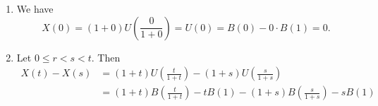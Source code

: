 \documentclass{homework}
\begin{document}
	\question 
	\begin{enumerate}
		\item We have 
		\begin{equation*}
			X(0) = (1+ 0)U\left(\frac{0}{1+0}\right) = U(0) =B(0) - 0\cdot B(1) =0.
		\end{equation*}	
		
		\item Let $0 \le r < s < t$. Then
		\begin{align*}
			X(t) - X(s) &= (1+t)U\left(\frac{t}{1+t}\right) - (1+s)U\left(\frac{s}{1+s}\right) \\
			&= (1+t)B\left(\frac{t}{1+t}\right) - t B(1) - (1+s)B\left(\frac{s}{1+s}\right) - sB(1) \\
		\end{align*}
	\end{enumerate}
	
\end{document}
